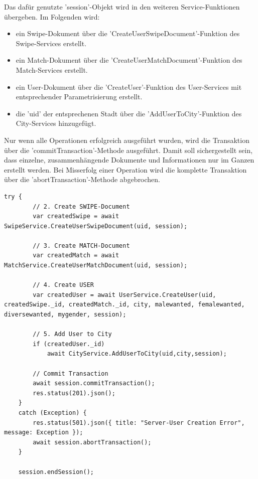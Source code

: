 Das dafür genutzte 'session'-Objekt wird in den weiteren Service-Funktionen übergeben. Im Folgenden wird:
\begin{itemize}
\item ein Swipe-Dokument über die 'CreateUserSwipeDocument'-Funktion des Swipe-Services erstellt.
\item ein Match-Dokument über die 'CreateUserMatchDocument'-Funktion des Match-Services erstellt. 
\item ein User-Dokument über die 'CreateUser'-Funktion des User-Services mit entsprechender Parametrisierung erstellt.
\item die 'uid' der entsprechenen Stadt über die 'AddUserToCity'-Funktion des City-Services hinzugefügt.
 \end{itemize}
Nur wenn alle Operationen erfolgreich ausgeführt wurden, wird die Transaktion über die 'commitTransaction'-Methode ausgeführt. Damit soll sichergestellt sein, dass einzelne, zusammenhängende Dokumente und Informationen nur im Ganzen erstellt werden. Bei Misserfolg einer Operation wird die komplette Transaktion über die 'abortTransaction'-Methode abgebrochen.

\begin{lstlisting}[caption=UserController - Create User - Dokumente erstellen, label=lst:UserControllerdocumentscreation]
try {
        // 2. Create SWIPE-Document
        var createdSwipe = await SwipeService.CreateUserSwipeDocument(uid, session);

        // 3. Create MATCH-Document
        var createdMatch = await MatchService.CreateUserMatchDocument(uid, session);

        // 4. Create USER
        var createdUser = await UserService.CreateUser(uid, createdSwipe._id, createdMatch._id, city, malewanted, femalewanted, diversewanted, mygender, session);

        // 5. Add User to City
        if (createdUser._id)
            await CityService.AddUserToCity(uid,city,session);
            
        // Commit Transaction
        await session.commitTransaction();
        res.status(201).json();
    }
    catch (Exception) {
        res.status(501).json({ title: "Server-User Creation Error", message: Exception });
        await session.abortTransaction();
    }

    session.endSession();
\end{lstlisting}
   
